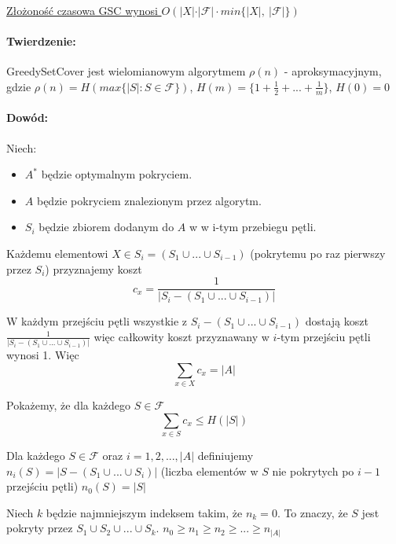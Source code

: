 \underline{Złożoność czasowa GSC wynosi $O(\vert X\vert \cdot \vert\mathcal{F}\vert \cdot min\lbrace \vert X \vert,\ \vert \mathcal{F}\vert \rbrace)$}

\paragraph{Twierdzenie: }GreedySetCover jest wielomianowym algorytmem $\rho(n)$ - aproksymacyjnym, gdzie $\rho(n) = H(max\lbrace\vert S\vert :S\in \mathcal{F}\rbrace)$, $H(m) = \lbrace 1 + \frac{1}{2} + ... +\frac{1}{m}\rbrace$, $H(0)=0$

\paragraph{Dowód: }
Niech:
\begin{itemize}
	\item $A^{\ast}$ będzie optymalnym pokryciem.
	\item $A$ będzie pokryciem znalezionym przez algorytm.
	\item $S_i$ będzie zbiorem dodanym do $A$ w w i-tym przebiegu pętli.
\end{itemize}

Każdemu elementowi $X\in S_i = (S_1 \cup ... \cup S_{i-1})$ (pokrytemu po raz pierwszy przez $S_i$) przyznajemy koszt $$c_x=\frac{1}{\vert S_i-(S_1\cup ... \cup S_{i-1})\vert}$$

W każdym przejściu pętli wszystkie z $S_i - (S_1 \cup ... \cup S_{i-1})$ dostają koszt $\frac{1}{\vert S_i-(S_1\cup ... \cup S_{i-1})\vert}$ więc całkowity koszt przyznawany w $i$-tym przejściu pętli wynosi 1. Więc $$\sum_{x\in X}c_x=\vert A \vert$$

Pokażemy, że dla każdego $S\in \mathcal{F}$ $$\sum_{x \in S}c_x \leq H(\vert S\vert)$$ 

Dla każdego $S\in \mathcal{F}$ oraz $i=1,2,...,\vert A \vert$ definiujemy $n_i(S) = \vert S - (S_1 \cup ... \cup S_i)\vert$ (liczba elementów w $S$ nie pokrytych po $i-1$ przejściu pętli)
$n_0(S) = \vert S\vert$

Niech $k$ będzie najmniejszym indeksem takim, że $n_k=0$. To znaczy, że $S$ jest pokryty przez $S_1 \cup S_2 \cup ... \cup S_k$. $n_0\geq n_1\geq n_2\geq ...\geq n_{\vert A \vert}$

